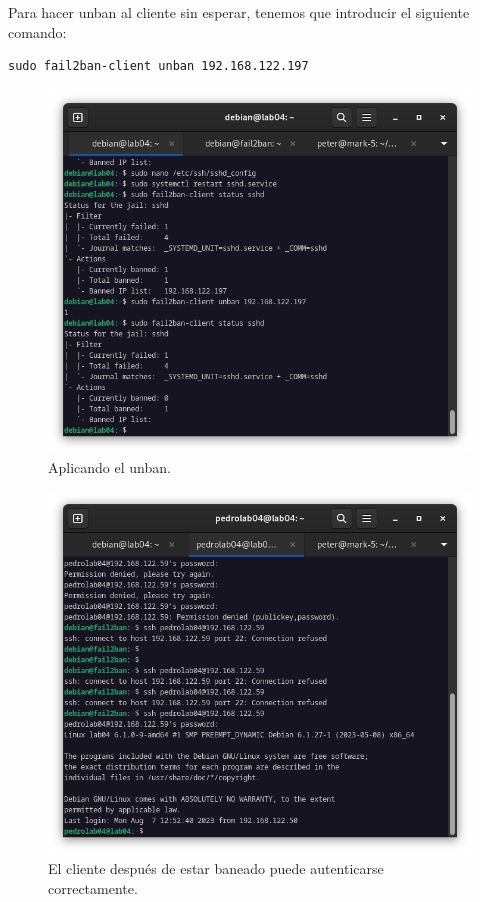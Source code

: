 Para hacer unban al cliente sin esperar, tenemos que introducir el siguiente comando:

\begin{lstlisting}[style=mybash]
sudo fail2ban-client unban 192.168.122.197
\end{lstlisting}

\begin{figure}[H]
	\centering
	\includegraphics[scale=0.40]{09}
	\caption{Aplicando el unban.}
\end{figure}

\begin{figure}[H]
	\centering
	\includegraphics[scale=0.40]{10}
	\caption{El cliente después de estar baneado puede autenticarse correctamente.}
\end{figure}

